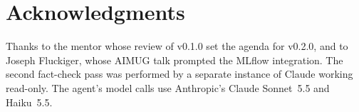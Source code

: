 \documentclass[11pt]{article}
\begin{document}
\section*{Acknowledgments}
Thanks to the mentor whose review of v0.1.0 set the agenda for v0.2.0, and to Joseph Fluckiger, whose AIMUG talk prompted the MLflow integration. The second fact-check pass was performed by a separate instance of Claude working read-only. The agent's model calls use Anthropic's Claude Sonnet~5.5 and Haiku~5.5.



\end{document}
